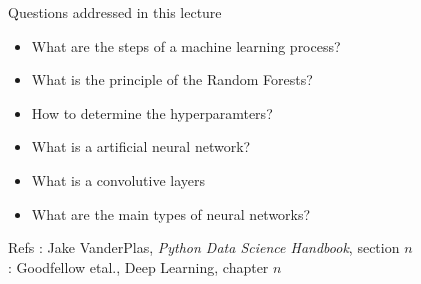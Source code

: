 \documentclass[handout]{beamer}
\begin{document}
\begin{frame}[fragile]{Questions addressed in this lecture}
    \begin{itemize}
        \item What are the steps of a machine learning process? 
        \item What is the principle of the Random Forests? \cite[5.8]{VanderPlas-2016}
        \item How to determine the hyperparamters? \cite[5.3]{VanderPlas-2016}
        \item What is a artificial neural network? \cite[6]{Goodfellow-et-al-2016}
        \item What is a convolutive layers \cite[9]{Goodfellow-et-al-2016}
        \item What are the main types of neural networks? \cite[10, 14, 20]{Goodfellow-et-al-2016}
    \end{itemize}

\begin{footnotesize}
\begin{block}{Refs}
\cite[$n$]{VanderPlas-2016}: Jake VanderPlas, \textit{Python Data Science Handbook}, section $n$\\
\cite[$n$]{Goodfellow-et-al-2016}: Goodfellow etal., Deep Learning, chapter $n$
\end{block}
\end{footnotesize}
\end{frame}
\end{document}
